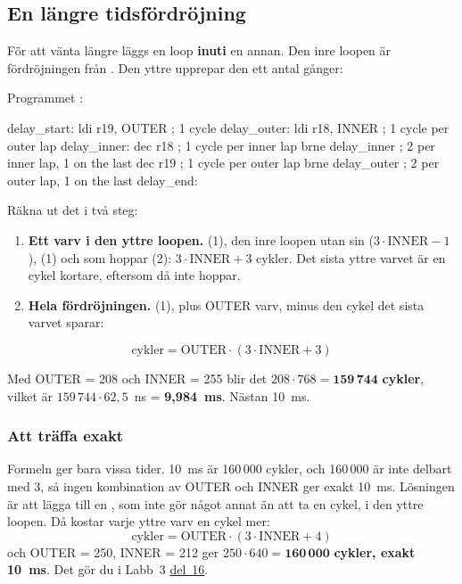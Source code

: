 \subsection{En längre tidsfördröjning}
\label{c9:b5}
För att vänta längre läggs en loop \textbf{inuti} en annan. Den inre loopen är fördröjningen från
. Den yttre upprepar den ett antal gånger:


\noindent Programmet :

\begin{asmcode}
delay_start:
    ldi r19, OUTER                  ; 1 cycle
delay_outer:
    ldi r18, INNER                  ; 1 cycle per outer lap
delay_inner:
    dec r18                         ; 1 cycle per inner lap
    brne delay_inner                ; 2 per inner lap, 1 on the last
    dec r19                         ; 1 cycle per outer lap
    brne delay_outer                ; 2 per outer lap, 1 on the last
delay_end:
\end{asmcode}

\noindent Räkna ut det i två steg:
\begin{enumerate}
  \item \textbf{Ett varv i den yttre loopen.}  (1), den inre loopen utan sin
     ($3 \cdot \text{INNER} - 1$),  (1) och  som hoppar (2):
    $3 \cdot \text{INNER} + 3$ cykler. Det sista yttre varvet är en cykel kortare, eftersom
     då inte hoppar.
  \item \textbf{Hela fördröjningen.}  (1), plus OUTER varv, minus den cykel det
    sista varvet sparar:
\end{enumerate}
\[
  \text{cykler} = \text{OUTER} \cdot (3 \cdot \text{INNER} + 3)
\]

\noindent Med OUTER = 208 och INNER = 255 blir det $208 \cdot 768 = \mathbf{159\,744}$
\textbf{cykler}, vilket är $159\,744 \cdot 62,5$~ns = \textbf{9,984~ms}. Nästan 10~ms.

\subsubsection{Att träffa exakt}
Formeln ger bara vissa tider. 10~ms är 160\,000 cykler, och 160\,000 är inte delbart med 3, så
ingen kombination av OUTER och INNER ger exakt 10~ms. Lösningen är att lägga till en ,
som inte gör något annat än att ta en cykel, i den yttre loopen. Då kostar varje yttre varv en
cykel mer:
\[
  \text{cykler} = \text{OUTER} \cdot (3 \cdot \text{INNER} + 4)
\]
och OUTER = 250, INNER = 212 ger $250 \cdot 640 = \mathbf{160\,000}$ \textbf{cykler, exakt 10~ms}.
Det gör du i Labb~3 \hyperref[lab3:d16]{del~16}.

